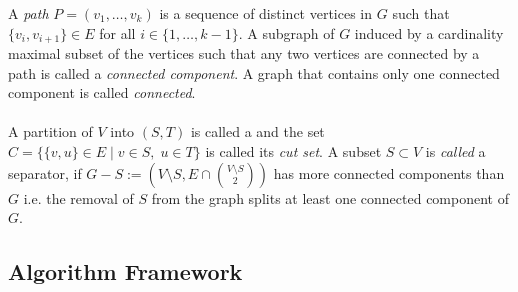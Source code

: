 \documentclass[]{article}
\begin{document}
A \textit{path} $P=(v_1,\dots,v_k)$ is a sequence of distinct vertices in $G$ such that $\{v_i,v_{i+1}\}\in E$ for all $i \in \{1,\dots,k-1\}$. A subgraph of $G$ induced by a cardinality maximal subset of the vertices such that any two vertices are connected by a path is called a \textit{connected component}. A graph that contains only one connected component is called \textit{connected}. \paragraph{}
A partition of $V$ into $(S,T)$ is called a  and the set $C = \{\{v,u\}\in E\;|\;v\in S,\; u\in T\}$ is called its \textit{cut set}. A subset $S\subset V$ is \textit{called} a separator, if $G-S := (V\setminus S, E\cap\binom{V\setminus S}{2})$ has more connected components than $G$ i.e. the removal of $S$ from the graph splits at least one connected component of $G$.

\subsection{Algorithm Framework}
\end{document}
